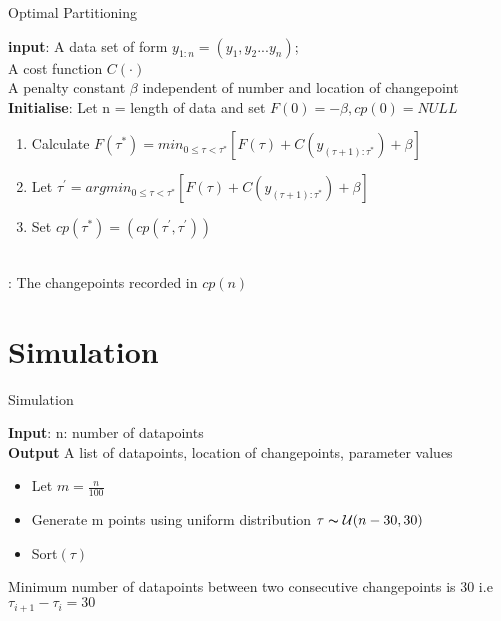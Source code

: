 \documentclass{article}
\begin{document}
\begin{algorithm}
\caption{Optimal Partitioning}\label{alg:cap}

\textbf{input}: A data set of form $y_{1:n} = (y_{1},y_{2}...y_{n})$;\\
\qquad  A cost function $C(\cdot)$\\
\qquad A penalty constant $\beta$ independent of number and location of changepoint\\
\textbf{Initialise}: Let n = length of data and set $F(0) = -\beta, cp(0) = NULL$\\
\begin{algorithmic}
    \begin{enumerate}
        \item Calculate $F(\tau^{*}) = min_{0 \leq \tau < \tau^{*}} [F(\tau) + C(y_{(\tau+1) : \tau^{*}}) + \beta]$
        \item Let $\tau^{'} = argmin_{0 \leq \tau < \tau^{*}} [F(\tau) + C(y_{(\tau+1) : \tau^{*}}) + \beta]$
        \item Set $ cp(\tau^{*}) = (cp(\tau^{'} , \tau^{'}))$
    \end{enumerate}
\EndFor\\
\Return : The changepoints recorded in $cp(n)$ 
\end{algorithmic}
\end{algorithm}


\section{Simulation}

\begin{algorithm}
\caption{Simulation}\label{alg:cap}
\textbf{Input}: n: number of datapoints\\
\textbf{Output} A list of datapoints, location of changepoints, parameter values
\begin{algorithmic}
\begin{itemize}
    \item  Let $ m = \frac{n}{100}$
    \item  Generate m points using uniform distribution $\tau \thicksim \mathcal{U} (n-30,30)$ 
    \item  Sort$(\tau)$
\end{itemize}
     \Ensure Minimum number of datapoints between two consecutive changepoints is 30 i.e $\tau_{i+1} - \tau_{i} = 30$ 

\end{algorithmic}
\end{algorithm}
\end{document}
